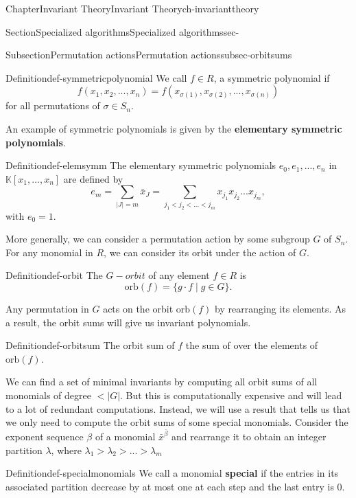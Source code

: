 \documentclass[oneside,10pt,]{book}
\newcommand{\terminology}[1]{\textbf{#1}}
\newcommand{\lt}{<}
\newcommand{\gt}{>}
\begin{document}
\begin{chapterptx}{Chapter}{Invariant Theory}{}{Invariant Theory}{}{}{ch-invarianttheory}
\begin{sectionptx}{Section}{Specialized algorithms}{}{Specialized algorithms}{}{}{sec-}
\begin{subsectionptx}{Subsection}{Permutation actions}{}{Permutation actions}{}{}{subsec-orbitsums}
\begin{definition}{Definition}{}{def-symmetricpolynomial}%
We call \(f \in R\), a symmetric polynomial if%
\begin{equation*}
f(x_1,x_2,...,x_n) = f(x_{\sigma(1)},x_{\sigma(2)},...,x_{\sigma(n)})
\end{equation*}
for all permutations of \(\sigma \in S_n\).%
\end{definition}
An example of symmetric polynomials is given by the \terminology{elementary symmetric polynomials}.%
\begin{definition}{Definition}{}{def-elemsymm}%
The elementary symmetric polynomials \(e_0,e_1,...,e_n\) in \(\mathbb{K}[x_1,...,x_n]\) are defined by%
\begin{equation*}
e_{m}=\sum_{|J|=m} \bar x_J = \sum_{j_1 \lt j_2 \lt ... \lt j_m} x_{j_1}x_{j_2}...x_{j_m}, 
\end{equation*}
with \(e_0=1\).%
\end{definition}
More generally, we can consider a permutation action by some subgroup \(G\) of \(S_n\). For any monomial in \(R\), we can consider its orbit under the action of \(G\).%
\begin{definition}{Definition}{}{def-orbit}%
The \(G-orbit\) of any element \(f \in R\) is%
\begin{equation*}
\text{orb}(f) = \{g \cdot f \mid g \in G\}\text{.}
\end{equation*}
%
\end{definition}
Any permutation in \(G\) acts on the orbit \(\text{orb}(f)\) by rearranging its elements. As a result, the orbit sums will give us invariant polynomials.%
\begin{definition}{Definition}{}{def-orbitsum}%
The orbit sum of \(f\) the sum of over the elements of  \(\text{orb}(f)\).%
\end{definition}
We can find a set of minimal invariants by computing all orbit sums of all monomials of degree \(\lt |G|\). But this is computationally expensive and will lead to a lot of redundant computations. Instead, we will use a result that tells us that we only need to compute the orbit sums of some special monomials. Consider the exponent sequence \(\beta\) of a monomial \(\bar x^{\bar \beta}\) and rearrange it to obtain an integer partition \(\lambda\), where \(\lambda_1 \gt \lambda_2 \gt ... \gt \lambda_m\)%
\begin{definition}{Definition}{}{def-specialmonomials}%
We call a monomial \terminology{special} if the entries in its associated partition decrease by at most one at each step and the last entry is 0.%

\end{definition}
\end{subsectionptx}
\end{sectionptx}
\end{chapterptx}
\end{document}
